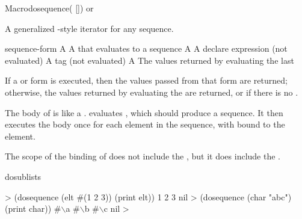 \documentclass[10pt,twoside,english,pdftex]{article}
\begin{document}
\begin{functiondoc}{Macro}{dosequence}{( 
  []) \superstar{} 
  \returns{} \superstar or \nil}
%
  
\fnsyntax

\fnpurpose A generalized -style iterator for any sequence.

\fnpackage {}

\fnmodule {}

\fnargs
\begin{args}{sequence-form}
\arg[var] A 
 A  that evaluates to a sequence
 A 
\arg[declarations] A declare expression (not evaluated)
\arg[tag] A  tag (not evaluated)
\arg[form] A 
\arg[results] The values returned by evaluating the last 
\end{args}

\fnreturns If a  or  form is executed,
then the values passed from that form are returned; otherwise, the values
returned by evaluating the  are returned, or \nil{}
if there is no .

\fndescription The body of  is like a
.   evaluates
, which should produce a sequence. It then executes
the body once for each element in the sequence, with  bound to the
element.

The scope of the binding of  does not include the
, but it does include the .

\begin{alsos}{dosublists}
\also[dosublists]
\end{alsos}

\fnexamples
%
\W\supp
\begin{example}
  > (dosequence (elt #(1 2 3)) (print elt))
  1 
  2 
  3 
  nil\goodpagebreak
  > (dosequence (char "abc") (print char))
  #\(\backslash\)a 
  #\(\backslash\)b 
  #\(\backslash\)c
  nil
  >
\end{example}

\end{functiondoc}
\end{document}
